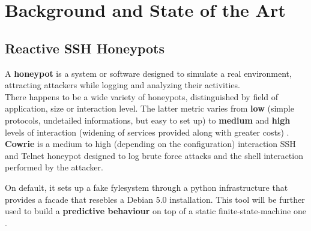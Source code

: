 \documentclass[10pt,a4paper,twocolumn]{article}
\begin{document}
\section{Background and State of the Art}
\label{sec:state-of-the-art}

\subsection{Reactive SSH Honeypots}
A \textbf{honeypot} is a system or software designed to simulate a real environment, attracting attackers while logging and analyzing their activities.\\
There happens to be a wide variety of honeypots, distinguished by field of application, size or interaction level. The latter metric varies from \textbf{low} (simple protocols,
undetailed informations, but easy to set up) to \textbf{medium} and \textbf{high} levels of interaction (widening of services provided along with greater costs) \cite{Honeypots101}.\\

\textbf{Cowrie} is a medium to high (depending on the configuration) interaction SSH and Telnet honeypot designed to log brute force attacks and the shell interaction performed by the attacker.

On default, it sets up a fake fylesystem through a python infrastructure that provides a facade that resebles a Debian 5.0 installation. 
This tool will be further used to build a \textbf{predictive behaviour} on top of a static finite-state-machine one \cite{CowrieDocumentation}.\\
\end{document}
